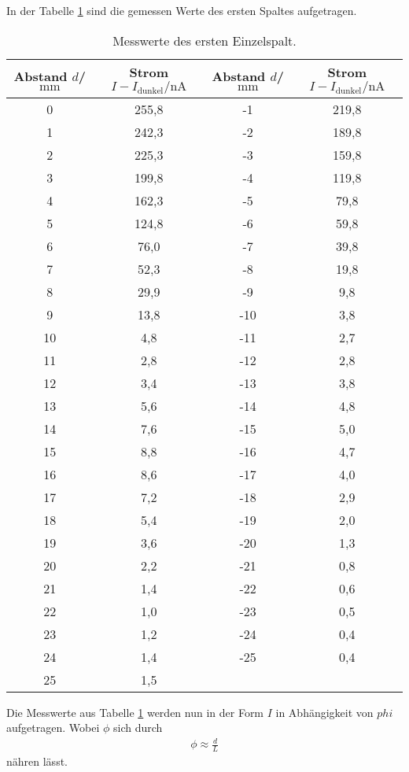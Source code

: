 In der Tabelle \ref{tab:spalt1} sind die gemessen Werte
des ersten Spaltes aufgetragen.
\begin{table}
  \centering
  \caption{Messwerte des ersten Einzelspalt.}
  \label{tab:spalt1}
  \begin{tabular}{c c c c}
Abstand $d$/$\si{\milli\meter}$ & Strom $I-I_\mathrm{dunkel}/\si{\nano\ampere}$ & Abstand $d$/$\si{\milli\meter}$ & Strom $I-I_\mathrm{dunkel}/\si{\nano\ampere}$\\
    \midrule
     0 & 255,8 & -1   & 219,8\\
     1 & 242,3 & -2   & 189,8\\
     2 & 225,3 & -3   & 159,8\\
     3 & 199,8 & -4   & 119,8\\
     4 & 162,3 & -5   & 79,8 \\
     5 & 124,8 & -6   & 59,8 \\
     6 & 76,0  & -7   & 39,8 \\
     7 & 52,3  & -8   & 19,8 \\
     8 & 29,9  & -9   & 9,8  \\
     9 & 13,8  & -10  & 3,8  \\
    10 & 4,8   & -11  & 2,7  \\
    11 & 2,8   & -12  & 2,8  \\
    12 & 3,4   & -13  & 3,8  \\
    13 & 5,6   & -14  & 4,8  \\
    14 & 7,6   & -15  & 5,0  \\
    15 & 8,8   & -16  & 4,7  \\
    16 & 8,6   & -17  & 4,0  \\
    17 & 7,2   & -18  & 2,9  \\
    18 & 5,4   & -19  & 2,0  \\
    19 & 3,6   & -20  & 1,3  \\
    20 & 2,2   & -21  & 0,8  \\
    21 & 1,4   & -22  & 0,6  \\
    22 & 1,0   & -23  & 0,5  \\
    23 & 1,2   & -24  & 0,4  \\
    24 & 1,4   & -25  & 0,4  \\
    25 & 1,5   & &           \\
    \bottomrule
    \end{tabular}
\end{table}
\FloatBarrier
Die Messwerte aus Tabelle \ref{tab:spalt1} werden nun
in der Form $I$ in Abhängigkeit von $phi$
aufgetragen.
Wobei $\phi$ sich durch
\begin{align*}
  \phi\approx\frac{d}{L}
\end{align*}
nähren lässt.

